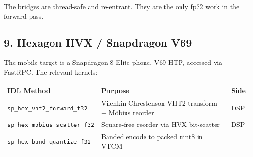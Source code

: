 \documentclass[
  11pt,
]{article}
\begin{document}
The bridges are thread-safe and re-entrant. They are the only fp32 work
in the forward pass.

\hypertarget{hexagon-hvx-snapdragon-v69}{%
\subsection{9. Hexagon HVX / Snapdragon
V69}\label{hexagon-hvx-snapdragon-v69}}

The mobile target is a Snapdragon 8 Elite phone, V69 HTP, accessed via
FastRPC. The relevant kernels:

\begin{longtable}[]{@{}lll@{}}
\toprule
\begin{minipage}[b]{0.39\columnwidth}\raggedright
IDL Method\strut
\end{minipage} & \begin{minipage}[b]{0.32\columnwidth}\raggedright
Purpose\strut
\end{minipage} & \begin{minipage}[b]{0.21\columnwidth}\raggedright
Side\strut
\end{minipage}\tabularnewline
\midrule
\endhead
\begin{minipage}[t]{0.39\columnwidth}\raggedright
\texttt{sp\_hex\_vht2\_forward\_f32}\strut
\end{minipage} & \begin{minipage}[t]{0.32\columnwidth}\raggedright
Vilenkin-Chrestenson VHT2 transform + Möbius reorder\strut
\end{minipage} & \begin{minipage}[t]{0.21\columnwidth}\raggedright
DSP\strut
\end{minipage}\tabularnewline
\begin{minipage}[t]{0.39\columnwidth}\raggedright
\texttt{sp\_hex\_mobius\_scatter\_f32}\strut
\end{minipage} & \begin{minipage}[t]{0.32\columnwidth}\raggedright
Square-free reorder via HVX bit-scatter\strut
\end{minipage} & \begin{minipage}[t]{0.21\columnwidth}\raggedright
DSP\strut
\end{minipage}\tabularnewline
\begin{minipage}[t]{0.39\columnwidth}\raggedright
\texttt{sp\_hex\_band\_quantize\_f32}\strut
\end{minipage} & \begin{minipage}[t]{0.32\columnwidth}\raggedright
Banded encode to packed uint8 in VTCM\strut

\end{minipage}
\end{longtable}
\end{document}
